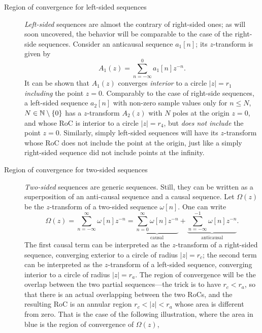 \documentclass[\documentfontsize, twocolumn]{\classname}
\begin{document}
\begin{description}
    \item[Region of convergence for left-sided sequences] \emph{Left-sided} se\-quen\-ces are almost the contrary of right-sided ones; as will soon uncovered, the behavior will be comparable to the case of the right-side sequences.
        Consider an anticausal sequence $a_1[n]$; its $z$-transform is given by
        \begin{equation}\label{eqn:zTransformAntiCausalSequence}
            A_1(z) = \sum_{n=-\infty}^0 a_1[n]z^{-n}.
        \end{equation}
        It can be shown that $A_1(z)$ converges \emph{interior} to a circle $|z| = r_1$ \emph{including} the point $z=0$. Comparably to the case of right-side sequences, a left-sided sequence $a_2[n]$ with non-zero sample values only for $n \leq N$, $N \in \mathbb N \setminus \{0\}$ has a $z$-transform $A_2(z)$ with $N$ poles at the origin $z = 0$, and whose RoC is interior to a circle $|z| = r_4$, but \emph{does not include} the point $z=0$. Similarly, simply left-sided sequences will have its $z$-transform whose RoC does not include the point at the origin, just like a simply right-sided sequence did not include points at the infinity.

    \item[Region of convergence for two-sided sequences] \emph{Two-sided} se\-quen\-ces are generic sequences. Still, they can be written as a superposition of an anti-causal sequence and a causal sequence.
        Let $\Omega(z)$ be the $z$-transform of a two-sided sequence $\omega[n]$. One can write
        \begin{equation}\label{eqn:zTransformTwoSidedSequence}
            \Omega(z) = \sum_{n=-\infty}^\infty \omega[n]z^{-n} = \underbrace{\sum_{n=0}^\infty \omega[n]z^{-n}}_{\mbox{causal}} + \underbrace{\sum_{n=-\infty}^{-1} \omega[n]z^{-n}}_{\mbox{anticausal}}.
        \end{equation}
        The first causal term can be interpreted as the $z$-transform of a right-sided sequence, converging exterior to a circle of radius $|z| = r_c$; the second term can be interpreted as the $z$-transform of a left-sided sequence, converging interior to a circle of radius $|z| = r_a$. 
        The region of convergence will be the overlap between the two partial sequences---the trick is to have $r_c < r_a$, so that there is an actual overlapping between the two RoCs, and the resulting RoC is an annular region $r_c < |z| < r_a$ whose area is different from zero. That is the case of the following illustration, where the area in blue is the region of convergence of $\Omega(z)$,


\end{description}
\end{document}
